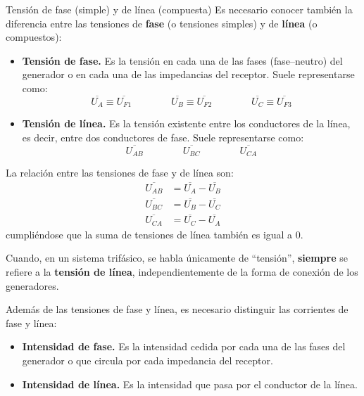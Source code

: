 \documentclass[11pt]{book} %
\makeatletter
\numberwithin{dummy}{section}
\theoremstyle{ocrenumbox}
\theoremstyle{blacknumex}
\theoremstyle{blacknumbox}
\theoremstyle{ocrenum}
\newenvironment{remark}{\par\vspace{10pt}\small %
\begin{list}{}{
\leftmargin=35pt %
\rightmargin=25pt}\item\ignorespaces %
\makebox[-2.5pt]{\begin{tikzpicture}[overlay]
\node[draw=ocre!60,line width=1pt,circle,fill=ocre!25,font=\sffamily\bfseries,inner sep=2pt,outer sep=0pt] at (-15pt,0pt){\textcolor{ocre}{N}};\end{tikzpicture}} %
\advance\baselineskip -1pt}{\end{list}\vskip5pt} %
\renewcommand{\subsection}{\@startsection {subsection}{2}{\z@}
{-3ex \@plus -0.1ex \@minus -.4ex}
{0.5ex \@plus.2ex }
{\normalfont\sffamily\bfseries}}
\newlength\esp
\makeatother
\begin{document}
	\subsection{Tensión de fase (simple) y de línea (compuesta)}\label{sec.fase_linea}
	Es necesario conocer también la diferencia entre las tensiones de \textbf{fase} (o tensiones simples) y de \textbf{línea} (o compuestos):
	\begin{itemize}
		\item \textbf{Tensión de fase.} Es la tensión en cada una de las fases (fase--neutro) del generador o en cada una de las impedancias del receptor. Suele representarse como: 
		\begin{equation*}
			\overline{U_A}\equiv \overline{U_{F1}} \qquad \qquad \overline{U_B}\equiv \overline{U_{F2}} \qquad \qquad \overline{U_C} \equiv \overline{U_{F3}} 
		\end{equation*}
		\item \textbf{Tensión de línea.} Es la tensión existente entre los conductores de la línea, es decir, entre dos conductores de fase. Suele representarse como: 
		\begin{equation*}
			\overline{U_{AB}} \qquad \qquad \overline{U_{BC}} \qquad \qquad \overline{U_{CA}} 
		\end{equation*}
	\end{itemize}
	La relación entre las tensiones de fase y de línea son: 
	\begin{align}\label{eq.tensionFL}
		\overline{U_{AB}} &= \overline{U_A} - \overline{U_B}\\
		\overline{U_{BC}} &= \overline{U_B} - \overline{U_C}\\
		\overline{U_{CA}} &= \overline{U_C} - \overline{U_A}
	\end{align}
	cumpliéndose que la suma de tensiones de línea también es igual a 0. 
	\begin{remark}
	    Cuando, en un sistema trifásico, se habla únicamente de ``tensión'', \textbf{siempre} se refiere a la \textbf{tensión de línea}, independientemente de la forma de conexión de los generadores.
	\end{remark}
	
	Además de las tensiones de fase y línea, es necesario distinguir las corrientes de fase y línea:
	\begin{itemize}
		\item \textbf{Intensidad de fase.} Es la intensidad cedida por cada una de las fases del generador o que circula por cada impedancia del receptor. 
		\item \textbf{Intensidad de línea.} Es la intensidad que pasa por el conductor de la línea. 
	\end{itemize}
	
\end{document}
